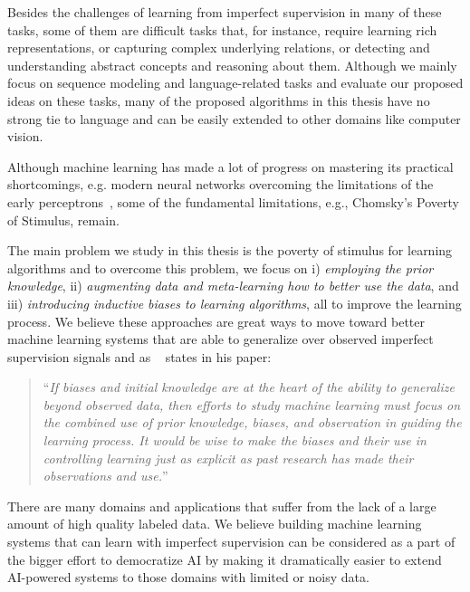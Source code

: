 Besides the challenges of learning from imperfect supervision in many of these tasks, some of them are difficult tasks that, for instance, require learning rich representations, or capturing complex underlying relations, or detecting and understanding abstract concepts and reasoning about them.
%
Although we mainly focus on sequence modeling and language-related tasks and evaluate our proposed ideas on these tasks, many of the proposed algorithms in this thesis have no strong tie to language and can be easily extended to other domains like computer vision.

\medskip
Although machine learning has made a lot of progress on mastering its practical shortcomings, e.g. modern neural networks overcoming the limitations of the early perceptrons~\citep{minsky69perceptrons}, some of the fundamental limitations, e.g., Chomsky's Poverty of Stimulus, remain.

The main problem we study in this thesis is the poverty of stimulus for learning algorithms and to overcome this problem, we focus on  i) \emph{employing the prior knowledge}, ii) \emph{augmenting data and meta-learning how to better use the data}, and iii) \emph{introducing inductive biases to learning algorithms}, all to improve the learning process. We believe these approaches are great ways to move toward better machine learning systems that are able to generalize over observed imperfect supervision signals and as ~\citet{Mitchell80theneed} states in his paper:
\begin{quote}
``\emph{If biases and initial knowledge are at the heart of the ability to generalize beyond observed data, then efforts to study machine learning must focus on the combined use of prior knowledge, biases, and observation in guiding the learning process. It would be wise to make the biases and their use in controlling learning just as explicit as past research has made their observations and use.}''
\end{quote}
There are many domains and applications that suffer from the lack of a large amount of high quality labeled data. We believe building machine learning systems that can learn with imperfect supervision can be considered as a part of the bigger effort to democratize AI by making it dramatically easier to extend AI-powered systems to those domains with limited or noisy data.


